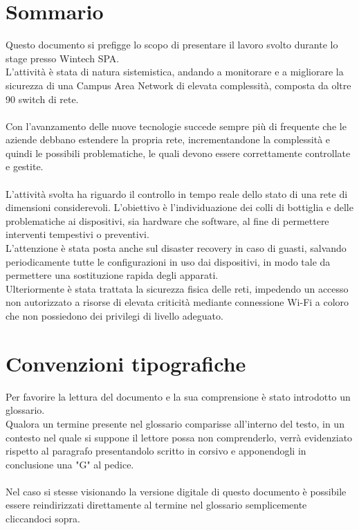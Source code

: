 \documentclass[Tesi.tex]{subfiles}
\begin{document}
\clearpage\thispagestyle{empty}
	
\renewcommand{\chaptername}{}
\renewcommand{\thechapter}{}
\chapter{Sommario}
Questo documento si prefigge lo scopo di presentare il lavoro svolto durante lo stage presso Wintech SPA. \\
L'attività è stata di natura sistemistica, andando a monitorare e a migliorare la sicurezza di una Campus Area Network di elevata complessità, composta da oltre 90 switch di rete. \\\\

Con l'avanzamento delle nuove tecnologie succede sempre più di frequente che le aziende debbano estendere la propria rete, incrementandone la complessità e quindi le possibili problematiche, le quali devono essere correttamente controllate e gestite. \\\\
L'attività svolta ha riguardo il controllo in tempo reale dello stato di una rete di dimensioni considerevoli. L'obiettivo è l'individuazione dei colli di bottiglia e delle problematiche ai dispositivi, sia hardware che software, al fine di permettere interventi tempestivi o preventivi.\\
L'attenzione è stata posta anche sul disaster recovery in caso di guasti, salvando periodicamente tutte le configurazioni in uso dai dispositivi, in modo tale da permettere una sostituzione rapida degli apparati. \\
Ulteriormente è stata trattata la sicurezza fisica delle reti, impedendo un accesso non autorizzato a risorse di elevata criticità mediante connessione Wi-Fi a coloro che non possiedono dei privilegi di livello adeguato. \\


\newpage
\chapter{Convenzioni tipografiche}
Per favorire la lettura del documento e la sua comprensione è stato introdotto un glossario. \\
Qualora un termine presente nel glossario comparisse all'interno del testo, in un contesto nel quale si suppone il lettore possa non comprenderlo, verrà evidenziato rispetto al paragrafo presentandolo scritto in corsivo e apponendogli in conclusione una "G" al pedice. \\\\
Nel caso si stesse visionando la versione digitale di questo documento è possibile essere reindirizzati direttamente al termine nel glossario semplicemente cliccandoci sopra. \\


\clearpage
\end{document}
